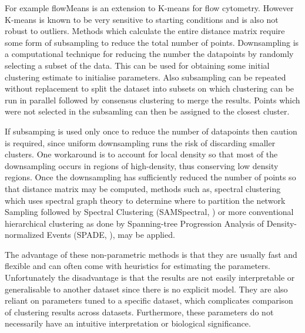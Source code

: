 For example flowMeans \citep{Aghaeepour:2010fv} is an extension to K-means for flow cytometry.
However K-means is known to be very sensitive to starting conditions and is also not robust to outliers.
Methods which calculate the entire distance matrix require some form of subsampling to reduce the total number of points.
Downsampling is a computational technique for reducing the number the datapoints by randomly selecting a subset of the data.
This can be used for obtaining some initial clustering estimate to initialise parameters.
Also subsampling can be repeated without replacement to split the dataset into subsets on which clustering can be run in parallel
followed by consensus clustering to merge the results.
Points which were not selected in the subsamling can then be assigned to the closest cluster. 

If subsamping is used only once to reduce the number of datapoints then 
caution is required, since uniform downsampling runs the risk of discarding smaller clusters.
One workaround is to account for local density so that most of the downsampling occurs in regions of high-density,
thus conserving low density regions.
Once the downsampling has sufficiently reduced the number of points so that distance matrix may be computed,
methods such as, spectral clustering which uses spectral graph theory to determine where to partition the network
Sampling followed by Spectral Clustering (SAMSpectral, \citet{Zare:2010cw}) or more conventional hierarchical clustering
as done by Spanning-tree Progression Analysis of Density-normalized Events (SPADE, \citet{Simonds:2011jh}), may be applied.

The advantage of these non-parametric methods is that they are usually fast and flexible and can often come with heuristics for estimating the parameters.
Unfortunately the disadvantage is that the results are not easily interpretable or generalisable to another dataset since there is no explicit model.
They are also reliant on parameters tuned to a specific dataset, which complicates comparison of clustering results across datasets.
Furthermore, these parameters do not necessarily have an intuitive interpretation or biological significance.


